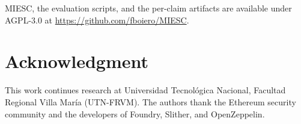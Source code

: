 \documentclass[conference]{IEEEtran}
\begin{document}
MIESC, the evaluation scripts, and the per-claim artifacts are available under AGPL-3.0 at \url{https://github.com/fboiero/MIESC}.

\section*{Acknowledgment}

This work continues research at Universidad Tecnol\'ogica Nacional, Facultad Regional Villa Mar\'ia (UTN-FRVM). The authors thank the Ethereum security community and the developers of Foundry, Slither, and OpenZeppelin.



\end{document}

